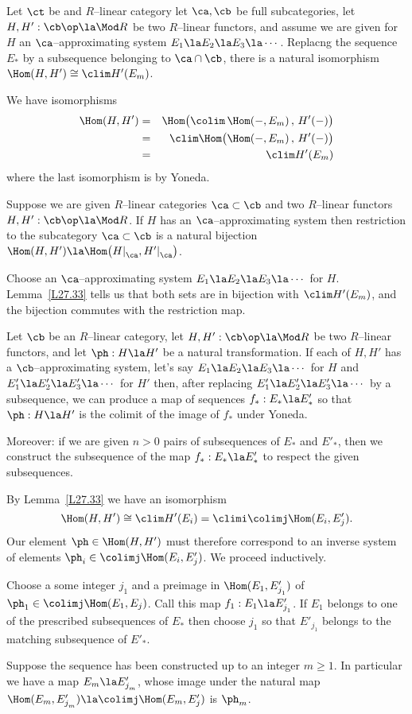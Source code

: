 \documentclass[11pt]{amsart}
\begin{document}
Let $\ct$ be and $R$--linear 
category let $\ca,\cb$ be full subcategories,
let $H,H':\cb\op\la\Mod R$ be two $R$--linear functors,
and assume we are given for $H$ an $\ca$--approximating
system $E_1\la E_2\la E_3\la\cdots$. Replacng the sequence $E_*$ by
a subsequence belonging to $\ca\cap\cb$, there is a natural
isomorphism $\Hom(H,H')\cong\clim H'(E_m)$.
\elem

\prf
We have isomorphisms
\begin{eqnarray*}
  \Hom(H,H') &=& \Hom\big(\colim\,\Hom(-,E_m)\,,\,H'(-)\big)\\
  &=& \clim\Hom\big(\Hom(-,E_m)\,,\,H'(-)\big)\\
  &=& \clim H'(E_m)
\end{eqnarray*}
where the last isomorphism is by Yoneda.
\eprf

Suppose we are given $R$--linear categories $\ca\subset\cb$ and
two $R$--linear functors $H,H':\cb\op\la\Mod R$. If $H$ has
an $\ca$--approximating
system then restriction to the subcategory $\ca\subset\cb$ is a natural
bijection $\Hom(H,H')\la\Hom\big(H|_\ca^{},H'|_\ca^{}\big)$.
\ecor

\prf
Choose an $\ca$--approximating system $E_1\la E_2\la E_3\la\cdots$ for $H$.
Lemma~\ref{L27.33} tells us that both sets are in bijection with
$\clim H'(E_m)$, and the bijection commutes with the restriction map.
\eprf




Let $\cb$ be an $R$--linear category, let $H,H':\cb\op\la\Mod R$ be two
$R$--linear functors, and let $\ph:H\la H'$ be a natural transformation.
If each of $H,H'$ has a $\cb$--approximating system, let's say
$E_1\la E_2\la E_3\la\cdots$ for $H$ and $E'_1\la E'_2\la E'_3\la\cdots$
for $H'$ then, after replacing $E'_1\la E'_2\la E'_3\la\cdots$
by a subsequence, we can produce a map of sequences $f_*:E_*\la E'_*$
so that $\ph:H\la H'$ is the colimit of the image of
$f_*$ under Yoneda.

Moreover: if we are given $n>0$ pairs of subsequences of $E_*$ and $E'_*$,
then we construct the subsequence of the map $f_*:E_*\la E'_*$ to respect the
given subsequences.
\elem

\prf
By Lemma~\ref{L27.33} we have an isomorphism
\[\Hom(H,H')\cong \clim H'(E_i)=\climi\colimj\Hom(E_i, E'_j).
\]
Our element $\ph\in\Hom(H,H')$ must therefore correspond to an inverse
system of elements $\ph_i\in\colimj\Hom(E_i,E'_j)$. We proceed inductively.
\be
\item
  Choose a some integer $j_1^{}$ and a preimage in $\Hom(E_1,E'_{j_1^{}})$
  of $\ph_1\in\colimj\Hom(E_1,E_j)$. Call this map $f_1:E_1\la E'_{j_1^{}}$.
  If $E_1$ belongs to one of the prescribed subsequences of $E_*$ then
  choose $j_1^{}$ so that $ E'_{j_1^{}}$ belongs to the matching subsequence
  of $E'_*$.
\item
  Suppose the sequence has been constructed up to an integer $m\geq1$. In
  particular we have a map $E_m\la  E'_{j_m^{}}$, whose image under
  the natural map $\Hom(E_m,E'_{j_m^{}})\la\colimj\Hom(E_m,E'_j)$
  is $\ph_m$.
\end{document}
